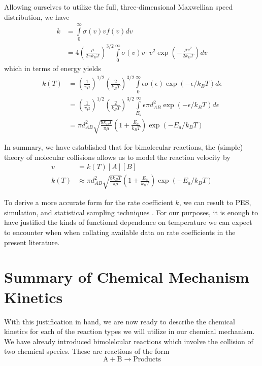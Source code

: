 Allowing ourselves to utilize the full, three-dimensional Maxwellian speed distribution, we have
\begin{equation}
  \begin{aligned}
  k &= \int\limits_0^\infty \sigma(v)v f(v) dv \\
  &= 4\left(\frac{\mu}{2\pi k_BT} \right)^{3/2}\int\limits_0^\infty \sigma(v)v \cdot v^2\exp\left(-\frac{\mu v^2}{2k_BT} \right)dv
  \end{aligned}
\end{equation}
which in terms of energy yields
\begin{equation}
  \begin{aligned}
  k(T) &= \left(\frac{1}{\pi \mu} \right)^{1/2}\left(\frac{2}{k_BT}\right)^{3/2}\int\limits_{0}^{\infty}\epsilon\sigma(\epsilon)\exp(-\epsilon/k_BT)d\epsilon \\
  &= \left(\frac{1}{\pi \mu} \right)^{1/2}\left(\frac{2}{k_BT}\right)^{3/2}\int\limits_{E_a}^{\infty}\epsilon\pi d_{AB}^2\exp(-\epsilon/k_BT)d\epsilon \\
  &= \pi d_{AB}^2 \sqrt{\frac{8k_BT}{\pi \mu}}\left(1 + \frac{E_a}{k_BT} \right)\exp(-E_a/k_BT)
  \end{aligned}
\end{equation}

In summary, we have established that for bimolecular reactions, the (simple) theory of molecular collisions allows us to model the reaction velocity by
\begin{align}
  v &= k(T)[A][B] \\
  k(T) &\approx \pi d_{AB}^2 \sqrt{\frac{8k_BT}{\pi \mu}}\left(1 + \frac{E_a}{k_BT}\right)\exp(-E_a/k_BT) \label{eq:collision-rrate}
\end{align}

To derive a more accurate form for the rate coefficient $k$, we can result to PES, simulation, and statistical sampling techniques \cite[for example]{pes-h-h2, pes-for-k}. For our purposes, it is enough to have justified the kinds of functional dependence on temperature we can expect to encounter when when collating available data on rate coefficients in the present literature.



\section{Summary of Chemical Mechanism Kinetics}

With this justification in hand, we are now ready to describe the chemical kinetics for each of the reaction types we will utilize in our chemical mechanism. We have already introduced bimolelcular reactions which involve the collision of two chemical species. These are reactions of the form
\begin{equation}
  \mathrm{A} + \mathrm{B} \longrightarrow \text{Products}
\end{equation}

